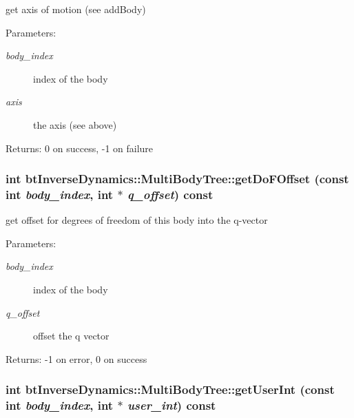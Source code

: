 get axis of motion (see addBody) \begin{Desc}
\item[Parameters:]
\begin{description}
\item[{\em body\_\-index}]index of the body \item[{\em axis}]the axis (see above) \end{description}
\end{Desc}
\begin{Desc}
\item[Returns:]0 on success, -1 on failure \end{Desc}
\hypertarget{classbt_inverse_dynamics_1_1_multi_body_tree_fd9a288177719c951a7b851a6491f308}{
\subsubsection[getDoFOffset]{\setlength{\rightskip}{0pt plus 5cm}int btInverseDynamics::MultiBodyTree::getDoFOffset (const int {\em body\_\-index}, \/  int $\ast$ {\em q\_\-offset}) const}}
\label{classbt_inverse_dynamics_1_1_multi_body_tree_fd9a288177719c951a7b851a6491f308}


get offset for degrees of freedom of this body into the q-vector \begin{Desc}
\item[Parameters:]
\begin{description}
\item[{\em body\_\-index}]index of the body \item[{\em q\_\-offset}]offset the q vector \end{description}
\end{Desc}
\begin{Desc}
\item[Returns:]-1 on error, 0 on success \end{Desc}
\hypertarget{classbt_inverse_dynamics_1_1_multi_body_tree_65a04485f338b3c3c1ace010d460a453}{
\subsubsection[getUserInt]{\setlength{\rightskip}{0pt plus 5cm}int btInverseDynamics::MultiBodyTree::getUserInt (const int {\em body\_\-index}, \/  int $\ast$ {\em user\_\-int}) const}}
\label{classbt_inverse_dynamics_1_1_multi_body_tree_65a04485f338b3c3c1ace010d460a453}


